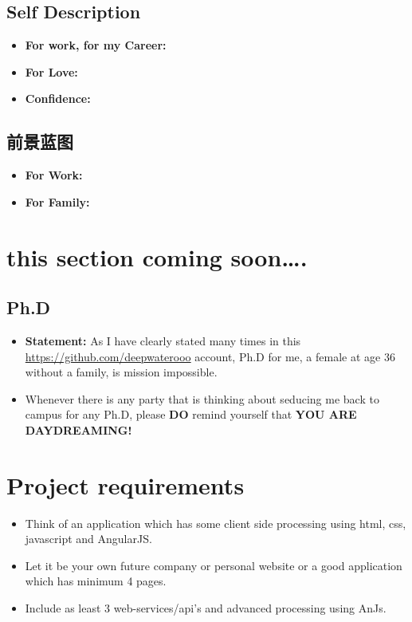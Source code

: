 \documentclass[9pt,b5paper]{article}
\begin{document}
\subsection{Self Description}
\label{sec-11-1}
\begin{itemize}
\item \textbf{For work, for my Career:}
\item \textbf{For Love:}
\item \textbf{Confidence:}
\end{itemize}

\subsection{前景蓝图}
\label{sec-11-2}
\begin{itemize}
\item \textbf{For Work:}
\item \textbf{For Family:}
\end{itemize}

\section{this section coming soon\ldots{}.}
\label{sec-12}
\subsection{Ph.D}
\label{sec-12-1}
\begin{itemize}
\item \textbf{Statement:} As I have clearly stated many times in this \url{https://github.com/deepwaterooo} account, Ph.D for me, a female at age 36 without a family, is mission impossible.
\item Whenever there is any party that is thinking about seducing me back to campus for any Ph.D, please \textbf{DO} remind yourself that \textbf{YOU ARE DAYDREAMING!}
\end{itemize}
\subsection{}
\label{sec-12-2}

\section{Project requirements}
\label{sec-13}
\begin{itemize}
\item Think of an application which has some client side processing using html, css, javascript and AngularJS.
\item Let it be your own future company or personal website or a good application which has minimum 4 pages.
\item Include as least 3 web-services/api's and advanced processing using AnJs.
\end{itemize}
\end{document}
